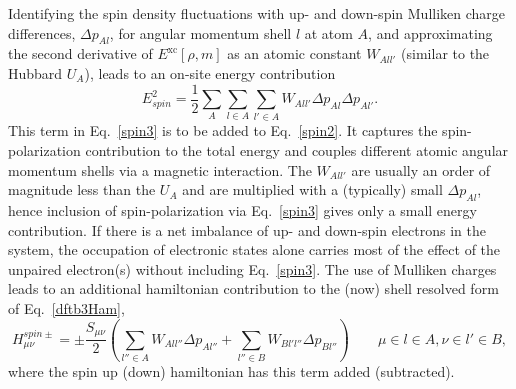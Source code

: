 \documentclass[reprint,onecolumn,superscriptaddress]{revtex4-1}
\begin{document}
Identifying the spin density fluctuations with up- and down-spin Mulliken charge
differences, $\Delta p_{Al}$, for angular momentum shell $l$ at atom $A$, and
approximating the second derivative of $E^{\text{xc}}[\rho,m]$ as an atomic
constant $W_{All'}$ (similar to the Hubbard $U_A$), leads to an on-site energy
contribution
\begin{equation}
  E^2_{spin}=\frac{1}{2}\sum_{A}\sum_{l \in A} \sum_{l' \in A} W_{All'} \Delta
  p_{Al}\Delta p_{Al'}.\label{spin3}
\end{equation}
This term in Eq.~\eqref{spin3} is to be added to Eq.~\eqref{spin2}. It captures
the spin-polarization contribution to the total energy and couples different
atomic angular momentum shells via a magnetic interaction. The $W_{All'}$ are
usually an order of magnitude less than the $U_A$ and are multiplied with a
(typically) small $\Delta p_{Al}$, hence inclusion of spin-polarization via
Eq.~\eqref{spin3} gives only a small energy contribution. If there is a net
imbalance of up- and down-spin electrons in the system, the occupation of
electronic states alone carries most of the effect of the unpaired electron(s)
without including Eq.~\eqref{spin3}.  The use of Mulliken charges leads to an
additional hamiltonian contribution\cite{Koehler2005} to the (now) shell
resolved form of Eq.~\eqref{dftb3Ham},
\begin{equation}
  H^{spin\pm}_{\mu\nu} = \pm \frac{S_{\mu\nu}}{2} \left( \sum\limits_{l'' \in A}
  W_{All''}\Delta p_{Al''} + \sum\limits_{l'' \in B} W_{Bl'l''}\Delta
  p_{Bl''}\right)\qquad{\mu \in l \in A, \nu \in l' \in B,}\label{spin4}
\end{equation}
where the spin up (down) hamiltonian has this term added (subtracted).
\end{document}

